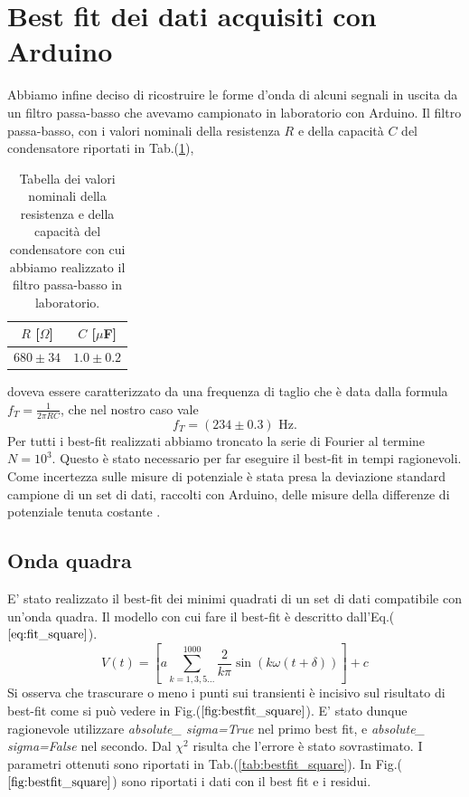 \documentclass{article}
\begin{document}
\section{Best fit dei dati acquisiti con Arduino}
    Abbiamo infine deciso di ricostruire le forme d'onda di alcuni segnali in uscita da un filtro passa-basso che avevamo
    campionato in laboratorio con Arduino. Il filtro passa-basso, con i valori nominali della resistenza $R$ e della capacità $C$ del
    condensatore riportati in Tab.(\ref{tab:val_nom}),
    \begin{table}[htbp]
        \centering
        \begin{tabular}{c c}
            \hline
            $R$ [$\Omega$] & $C$ [$\mu$F] \\
            \hline
            $680 \pm 34$ & $1.0 \pm 0.2$ \\
            \hline
        \end{tabular}
        \caption{Tabella dei valori nominali della resistenza e della capacità del condensatore con cui abbiamo realizzato il filtro passa-basso in laboratorio.}
        \label{tab:val_nom}
    \end{table}
    doveva essere caratterizzato da una frequenza di taglio che è data dalla formula $f_T = \frac{1}{2 \pi RC}$, che nel nostro caso vale
    $$
    f_T = (234 \pm 0.3) \text{ Hz}.
    $$
    Per tutti i best-fit realizzati abbiamo troncato la serie di Fourier al termine $N=10^3$. Questo è stato necessario per far eseguire il 
    best-fit in tempi ragionevoli.
    Come incertezza sulle misure di potenziale è stata
    presa la deviazione standard campione di un set di dati, raccolti con Arduino, delle misure
    della differenze di potenziale tenuta costante \cite{Antonacci_Sermi2024}.
    \subsection{Onda quadra}
            E' stato realizzato il best-fit dei minimi quadrati
            di un set di dati compatibile con un'onda quadra.
            Il modello con cui fare il best-fit è descritto dall'Eq.($\ref{eq:fit_square}$).
                \begin{equation}
                    V(t) = \left[a\sum_{k=1,3,5...}^{1000} \frac{2}{k\pi}\sin\left(k\omega (t+\delta)\right)\right] +c
                    \label{eq:fit_square}
                \end{equation}
            Si osserva che trascurare o meno i punti sui transienti è incisivo
            sul risultato di best-fit come si può vedere in Fig.($\ref{fig:bestfit_square}$).
            E' stato dunque ragionevole utilizzare \emph{absolute\_ sigma=True}
            nel primo best fit, e \emph{absolute\_ sigma=False} nel secondo.
            Dal $\chi^2$ risulta che l'errore è stato sovrastimato. 
            I parametri ottenuti sono riportati in Tab.(\ref{tab:bestfit_square}).
            In Fig.($\ref{fig:bestfit_square}$) sono riportati i dati con il best fit e 
            i residui.
            
\end{document}
